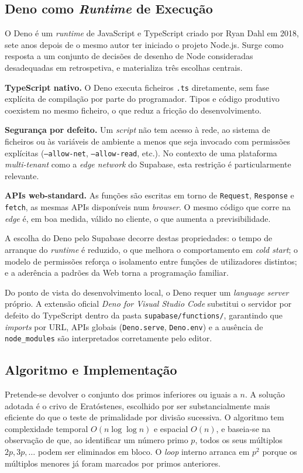 \documentclass[conference]{IEEEtran}
\begin{document}
\subsection{Deno como \textit{Runtime} de Execução}
O Deno \cite{deno} é um \textit{runtime} de JavaScript e TypeScript criado por Ryan Dahl em 2018, sete anos depois de o mesmo autor ter iniciado o projeto Node.js. Surge como resposta a um conjunto de decisões de desenho de Node consideradas desadequadas em retrospetiva, e materializa três escolhas centrais.

\textbf{TypeScript nativo.} O Deno executa ficheiros \texttt{.ts} diretamente, sem fase explícita de compilação por parte do programador. Tipos e código produtivo coexistem no mesmo ficheiro, o que reduz a fricção do desenvolvimento.

\textbf{Segurança por defeito.} Um \textit{script} não tem acesso à rede, ao sistema de ficheiros ou às variáveis de ambiente a menos que seja invocado com permissões explícitas (\texttt{--allow-net}, \texttt{--allow-read}, etc.). No contexto de uma plataforma \textit{multi-tenant} como a \textit{edge network} do Supabase, esta restrição é particularmente relevante.

\textbf{APIs web-standard.} As funções são escritas em torno de \texttt{Request}, \texttt{Response} e \texttt{fetch}, as mesmas APIs disponíveis num \textit{browser}. O mesmo código que corre na \textit{edge} é, em boa medida, válido no cliente, o que aumenta a previsibilidade.

A escolha do Deno pelo Supabase decorre destas propriedades: o tempo de arranque do \textit{runtime} é reduzido, o que melhora o comportamento em \textit{cold start}; o modelo de permissões reforça o isolamento entre funções de utilizadores distintos; e a aderência a padrões da Web torna a programação familiar.

Do ponto de vista do desenvolvimento local, o Deno requer um \textit{language server} próprio. A extensão oficial \textit{Deno for Visual Studio Code} substitui o servidor por defeito do TypeScript dentro da pasta \texttt{supabase/functions/}, garantindo que \textit{imports} por URL, APIs globais (\texttt{Deno.serve}, \texttt{Deno.env}) e a ausência de \texttt{node\_modules} são interpretados corretamente pelo editor.

\subsection{Algoritmo e Implementação}
Pretende-se devolver o conjunto dos primos inferiores ou iguais a $n$. A solução adotada é o crivo de Eratóstenes, escolhido por ser substancialmente mais eficiente do que o teste de primalidade por divisão sucessiva. O algoritmo tem complexidade temporal $O(n \log \log n)$ e espacial $O(n)$, e baseia-se na observação de que, ao identificar um número primo $p$, todos os seus múltiplos $2p, 3p, \dots$ podem ser eliminados em bloco. O \textit{loop} interno arranca em $p^{2}$ porque os múltiplos menores já foram marcados por primos anteriores.
\end{document}
